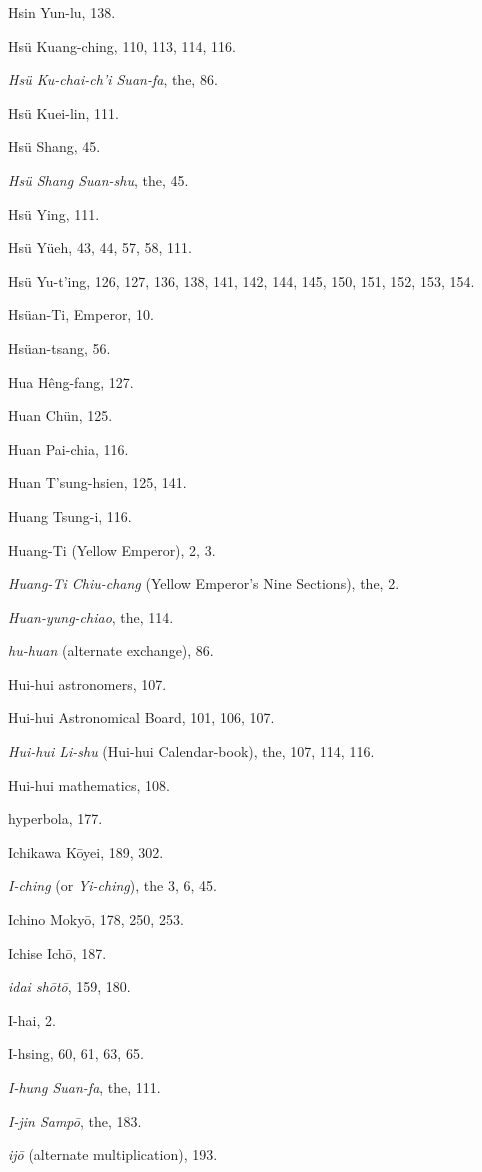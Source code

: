 \documentclass[11pt]{article}
\begin{document}
Hsin Yun-lu, 138.\par
Hsü Kuang-ching, 110, 113, 114, 116.\par
\emph{Hsü Ku-chai-ch'i Suan-fa}, the, 86.\par
Hsü Kuei-lin, 111.\par
Hsü Shang, 45.\par
\emph{Hsü Shang Suan-shu}, the, 45.\par
Hsü Ying, 111.\par
Hsü Yüeh, 43, 44, 57, 58, 111.\par
Hsü Yu-t'ing, 126, 127, 136, 138, 141, 142, 144, 145, 150, 151, 152, 153, 154.\par
Hsüan-Ti, Emperor, 10.\par
Hsüan-tsang, 56.\par
Hua Hêng-fang, 127.\par
Huan Chün, 125.\par
Huan Pai-chia, 116.\par
Huan T'sung-hsien, 125, 141.\par
Huang Tsung-i, 116.\par
Huang-Ti (Yellow Emperor), 2, 3.\par
\emph{Huang-Ti Chiu-chang} (Yellow Emperor's Nine Sections), the, 2.\par
\emph{Huan-yung-chiao}, the, 114.\par
\emph{hu-huan} (alternate exchange), 86.\par
Hui-hui astronomers, 107.\par
Hui-hui Astronomical Board, 101, 106, 107.\par
\emph{Hui-hui Li-shu} (Hui-hui Calendar-book), the, 107, 114, 116.\par
Hui-hui mathematics, 108.\par
hyperbola, 177.\par
\medskip
Ichikawa Kōyei, 189, 302.\par
\emph{I-ching} (or \emph{Yi-ching}), the 3, 6, 45.\par
Ichino Mokyō, 178, 250, 253.\par
Ichise Ichō, 187.\par
\emph{idai shōtō}, 159, 180.\par
I-hai, 2.\par
I-hsing, 60, 61, 63, 65.\par
\emph{I-hung Suan-fa}, the, 111.\par
\emph{I-jin Sampō}, the, 183.\par
\emph{ijō} (alternate multiplication), 193.\par
\end{document}
